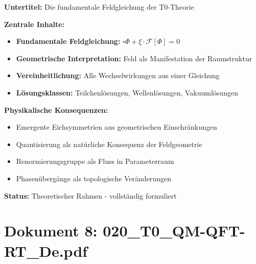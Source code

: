 	\begin{documentbox}
		\textbf{Untertitel:} Die fundamentale Feldgleichung der T0-Theorie
		
		\textbf{Zentrale Inhalte:}
		\begin{itemize}
			\item \textbf{Fundamentale Feldgleichung:} $\square \Phi + \xi \cdot \mathcal{F}[\Phi] = 0$
			\item \textbf{Geometrische Interpretation:} Feld als Manifestation der Raumstruktur
			\item \textbf{Vereinheitlichung:} Alle Wechselwirkungen aus einer Gleichung
			\item \textbf{Lösungsklassen:} Teilchenlösungen, Wellenlösungen, Vakuumlösungen
		\end{itemize}
		
		\textbf{Physikalische Konsequenzen:}
		\begin{itemize}
			\item Emergente Eichsymmetrien aus geometrischen Einschränkungen
			\item Quantisierung als natürliche Konsequenz der Feldgeometrie
			\item Renormierungsgruppe als Fluss in Parameterraum
			\item Phasenübergänge als topologische Veränderungen
		\end{itemize}
		
		\textbf{Status:} Theoretischer Rahmen - vollständig formuliert
	\end{documentbox}
	
	\section{Dokument 8: 020\_T0\_QM-QFT-RT\_De.pdf}
	
